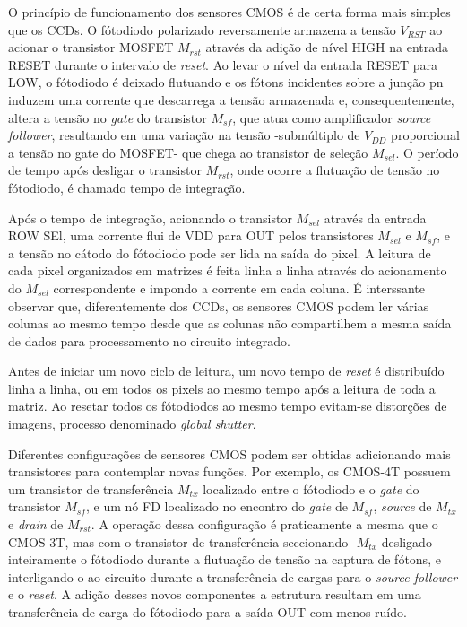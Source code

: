 \documentclass[10pt,a4paper,twocolumn]{article}
\begin{document}
	O princípio de funcionamento dos sensores CMOS é de certa forma mais simples que os CCDs. O fótodiodo polarizado reversamente armazena a tensão $V_{RST}$ ao acionar o transistor MOSFET $M_{rst}$ através da adição de nível HIGH na entrada RESET durante o intervalo de \textit{reset}. Ao levar o nível da entrada RESET para LOW, o fótodiodo é deixado flutuando e os fótons incidentes sobre a junção pn induzem uma corrente que descarrega a tensão armazenada e, consequentemente, altera a tensão no \textit{gate} do transistor $M_{sf}$, que atua como amplificador \textit{source follower}, resultando em uma variação na tensão -submúltiplo de $V_{DD}$ proporcional a tensão no gate do MOSFET- que chega ao transistor de seleção $M_{sel}$. O período de tempo após desligar o transistor $M_{rst}$, onde ocorre a flutuação de tensão no fótodiodo, é chamado tempo de integração.
	
	Após o tempo de integração, acionando o transistor $M_{sel}$ através da entrada ROW SEl, uma corrente flui de VDD para OUT pelos transistores $M_{sel}$ e $M_{sf}$, e a tensão no cátodo do fótodiodo pode ser lida na saída do pixel. A leitura de cada pixel organizados em matrizes é feita linha a linha através do acionamento do $M_{sel}$ correspondente e impondo a corrente em cada coluna. É interssante observar que, diferentemente dos CCDs, os sensores CMOS podem ler várias colunas ao mesmo tempo desde que as colunas não compartilhem a mesma saída de dados para processamento no circuito integrado.
	
	Antes de iniciar um novo ciclo de leitura, um novo tempo de \textit{reset} é distribuído linha a linha, ou em todos os pixels ao mesmo tempo após a leitura de toda a matriz. Ao resetar todos os fótodiodos ao mesmo tempo evitam-se distorções de imagens, processo denominado \textit{global shutter}.
	
	Diferentes configurações de sensores CMOS podem ser obtidas adicionando mais transistores para contemplar novas funções. Por exemplo, os CMOS-4T possuem um transistor de transferência $M_{tx}$ localizado entre o fótodiodo e o \textit{gate} do transistor $M_{sf}$, e um nó FD localizado no encontro do \textit{gate} de $M_{sf}$, \textit{source} de $M_{tx}$ e \textit{drain} de $M_{rst}$. A operação dessa configuração é praticamente a mesma que o CMOS-3T, mas com o transistor de transferência seccionando -$M_{tx}$ desligado- inteiramente o fótodiodo durante a flutuação de tensão na captura de fótons, e interligando-o ao circuito durante a transferência de cargas para o \textit{source follower} e o \textit{reset}. A adição desses novos componentes a estrutura resultam em uma transferência de carga do fótodiodo para a saída OUT com menos ruído.
	
\end{document}
